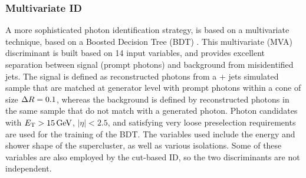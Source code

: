 \subsubsection{Multivariate ID}
A more sophisticated photon identification strategy, is based on a multivariate technique, based on a Boosted Decision Tree (BDT) \cite{CMS:EGM-17-001}.
This multivariate (MVA) discriminant is built based on 14 input variables,
and provides excellent separation between signal (prompt photons) and background from misidentified jets.
The signal is defined as reconstructed photons from a \PGg + jets simulated sample that are matched at generator level with prompt photons within a cone of size $\Delta R = 0.1$,
whereas the background is defined by reconstructed photons in the same sample that do not match with a generated photon.
Photon candidates with $E_{\mathrm{T}} > 15 \,\text{Ge\hspace{-.08em}V}$, $|\eta| < 2.5$, and satisfying very loose preselection requirements are used for the training of the BDT.
The variables used include the energy and shower shape of the supercluster, as well as various isolations.
Some of these variables are also employed by the cut-based ID, so the two discriminants are not independent.


